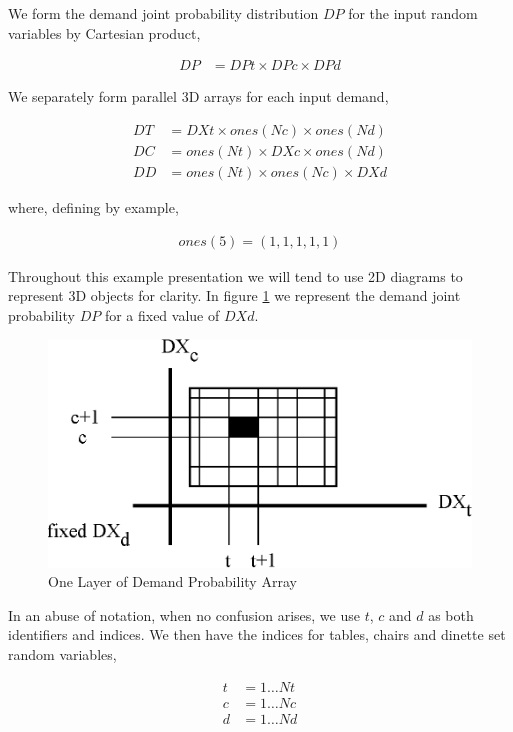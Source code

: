 We form the demand joint probability distribution $DP$ for the input random
variables by Cartesian product,

\begin{align*}
DP &= DPt \times DPc \times DPd
\end{align*}

We separately form parallel 3D arrays for each input demand,

\begin{align*}
DT &= DXt \times ones(Nc) \times ones(Nd)\\
DC &= ones(Nt) \times DXc \times ones(Nd)\\
DD &= ones(Nt) \times ones(Nc) \times DXd
\end{align*}

where, defining by example,

\begin{align*}
ones(5) = (1, 1, 1, 1, 1)
\end{align*}

Throughout this example presentation we will tend to use 2D diagrams
to represent 3D objects for clarity. In figure \ref{fig:tcd_rectangle} we
represent the demand joint probability $DP$ for a fixed value of $DXd$.

\begin{figure}
  \centering
  \includegraphics{Images/tcd_rectangle}
  \caption[One Layer of Demand Probability Array]
          {One Layer of Demand Probability Array}
  \label{fig:tcd_rectangle}
\end{figure}

In an abuse of notation, when no confusion arises, we use $t$, $c$ and
$d$ as both identifiers and indices. We then have the indices for
tables, chairs and dinette set random variables,

\begin{align*}
t &= 1 \dots Nt\\
c &= 1 \dots Nc\\
d &= 1 \dots Nd
\end{align*}

